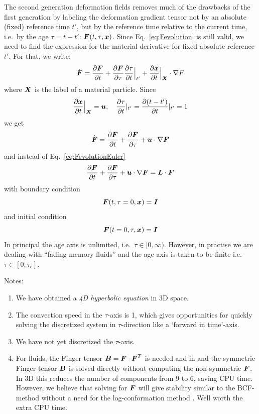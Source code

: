 The second generation deformation fields removes much of the drawbacks of the first generation by labeling the deformation gradient tensor not by an absolute (fixed) reference time $t'$, but by the reference time relative to the current time, i.e.\ by the age $\tau=t-t'$: $\boldsymbol{F}(t,\tau,\boldsymbol{x})$. Since Eq.~\eqref{eq:Fevolution} is still valid, we need to find the expression for the material derivative for fixed absolute reference $t'$. For that, we write:
\begin{equation}
  \dot {\boldsymbol{F}}=\dfrac{\partial \boldsymbol{F}}{\partial t}+\dfrac{\partial \boldsymbol{F}}{\partial \tau}\dfrac{\partial \tau}{\partial t}\Big|_{t'}+
    \dfrac{\partial \boldsymbol{x}}{\partial t}\Big|_{\boldsymbol{X}}\cdot\nabla F
\end{equation}
where $\boldsymbol{X}$ is the label of a material particle. Since 
\[
\dfrac{\partial \boldsymbol{x}}{\partial t}\Big|_{\boldsymbol{X}}=\boldsymbol{u}, \quad \dfrac{\partial \tau}{\partial t}|_{t'}=\dfrac{\partial (t-t')}{\partial t}|_{t'}=1
\]
we get
\begin{equation}
  \dot {\boldsymbol{F}}=\dfrac{\partial \boldsymbol{F}}{\partial t}+\dfrac{\partial \boldsymbol{F}}{\partial \tau}+\boldsymbol{u}\cdot\nabla\boldsymbol{F}
\end{equation}
and instead of Eq.~\eqref{eq:FevolutionEuler}
\begin{equation}
  \dfrac{\partial \boldsymbol{F}}{\partial t}+\dfrac{\partial \boldsymbol{F}}{\partial \tau}+\boldsymbol{u}\cdot\nabla\boldsymbol{F}=\boldsymbol{L}\cdot \boldsymbol{F}\label{eq:Fevolutiontau}
\end{equation}
with boundary condition
\begin{equation}
  \boldsymbol{F}(t,\tau=0,\boldsymbol{x})=\boldsymbol{I}
\end{equation}
and initial condition
\begin{equation}
  \boldsymbol{F}(t=0,\tau,\boldsymbol{x})=\boldsymbol{I}
\end{equation}
In principal the age axis is unlimited, i.e.\ $\tau\in[0,\infty)$. However, in practise we are dealing with ``fading memory fluids'' and the age axis is taken to be finite i.e.\ $\tau\in[0,\tau_\text{c}]$.

Notes:
\begin{enumerate}
   \item We have obtained a \emph{4D hyperbolic equation} in 3D space. 
   \item The convection speed in the $\tau$-axis is 1, which gives opportunities for quickly 
         solving the discretized system in $\tau$-direction like a `forward in time'-axis.
  \item We have not yet discretized the $\tau$-axis.
  \item For fluids, the Finger tensor $\boldsymbol{B}=\boldsymbol{F}\cdot\boldsymbol{F}^T$ is needed and in \cite{Peters2000b} and 
  \cite{Hulsen01} the symmetric Finger tensor $\boldsymbol{B}$ is solved directly without computing the non-symmetric
   $\boldsymbol{F}$. In 3D this reduces the number of components from 9 to 6, saving CPU time.
      However, we believe that solving for $\boldsymbol{F}$ will give stability similar to the BCF-method
      without a need for the log-conformation method \cite{Mangoubi2009}. Well worth the extra CPU time.
\end{enumerate}

